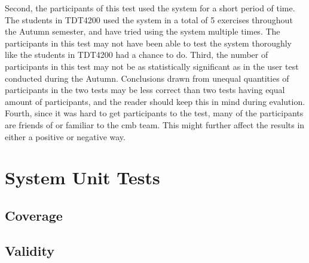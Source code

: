 Second, the participants of this test used the system for a short period of time. The students in TDT4200 used the system in a total of 5 exercises throughout the Autumn semester, and have tried using the system multiple times. The participants in this test may not have been able to test the system thoroughly like the students in TDT4200 had a chance to do. Third, the number of participants in this test may not be as statistically significant as in the user test conducted during the Autumn. Conclusions drawn from unequal quantities of participants in the two tests may be less correct than two tests having equal amount of participants, and the reader should keep this in mind during evalution. Fourth, since it was hard to get participants to the test, many of the participants are friends of or familiar to the \gls{cmb} team. This might further affect the results in either a positive or negative way. \\


\section{System Unit Tests}

\subsection{Coverage}

\subsection{Validity}
